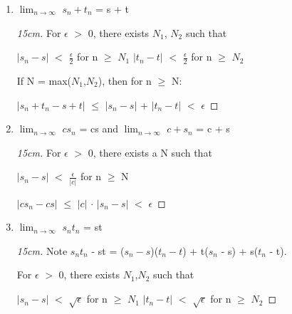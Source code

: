 	\begin{enumerate}[label=(\alph*), leftmargin=2cm, itemsep=0.1cm]
        \item $\lim_{n \rightarrow \infty}$ $s_n + t_n$ = s + t
        
            \begin{proof}[15cm]
                For $\epsilon$ $>$ 0, there exists $N_1$, $N_2$ such that

                \hspace{0.5cm}
                $|s_n - s|$ $<$ $\frac{\epsilon}{2}$ for n $\geq$ $N_1$
                \hspace{1cm}
                $|t_n - t|$ $<$ $\frac{\epsilon}{2}$ for n $\geq$ $N_2$

                If N = max($N_1$,$N_2$), then for n $\geq$ N:

                \hspace{0.5cm}
                $|s_n+t_n - s+t|$ $\leq$ $|s_n - s|$ + $|t_n - t|$ $<$ $\epsilon$
            \end{proof}
        
        \item $\lim_{n \rightarrow \infty}$ $cs_n$ = cs and 
            $\lim_{n \rightarrow \infty}$ $c + s_n$ = c + s

            \begin{proof}[15cm]
                For $\epsilon$ $>$ 0, there exists a N such that

                \hspace{0.5cm}
                $|s_n - s|$ $<$ $\frac{\epsilon}{|c|}$
                \hspace{1cm}
                for n $\geq$ N

                \hspace{0.5cm}
                $|cs_n - cs|$ $\leq$ $|c|$ $\cdot$ $|s_n - s|$ $<$ $\epsilon$                
            \end{proof}
        
        \item $\lim_{n \rightarrow \infty}$ $s_n t_n$ = st
        
            \begin{proof}[15cm]
                Note $s_n t_n$ - st
                = ($s_n - s$)($t_n - t$) + t($s_n$ - s) + s($t_n$ - t).

                For $\epsilon$ $>$ 0, there exists $N_1$,$N_2$ such that

                \hspace{1cm}
                $|s_n - s|$ $<$ $\sqrt{\epsilon}$ for n $\geq$ $N_1$
                \hspace{1cm}
                $|t_n - t|$ $<$ $\sqrt{\epsilon}$ for n $\geq$ $N_2$


\end{proof}
\end{enumerate}
